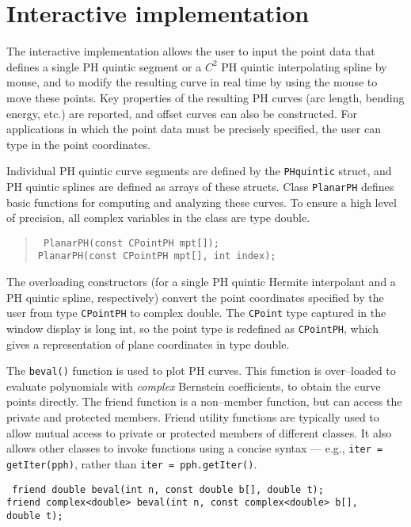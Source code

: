 \documentclass[12pt]{article}
\begin{document}
\section{Interactive implementation}

The interactive implementation allows the user to input the point data 
that defines a single PH quintic segment or a $C^2$ PH quintic interpolating 
spline by mouse, and to modify the resulting curve in real time by using 
the mouse to move these points. Key properties of the resulting PH curves 
(arc length, bending energy, etc.) are reported, and offset curves can 
also be constructed. For applications in which the point data must be 
precisely specified, the user can type in the point coordinates.

Individual PH quintic curve segments are defined by the {\tt PHquintic} 
struct, and PH quintic splines are defined as arrays of these structs. 
Class {\tt PlanarPH} defines basic functions for computing and analyzing 
these curves. To ensure a high level of precision, all complex variables 
in the class are type double.

\begin{quote}
{\tt
PlanarPH(const CPointPH m\underline{\hphantom{x}}pt[]); \\
PlanarPH(const CPointPH m\underline{\hphantom{x}}pt[], int index);
}
\end{quote}

\noindent
The overloading constructors (for a single PH quintic Hermite interpolant
and a PH quintic spline, respectively) convert the point coordinates 
specified by the user from type {\tt CPointPH} to complex double. The 
{\tt CPoint} type captured in the window display is long int, so the point 
type is redefined as {\tt CPointPH}, which gives a representation of plane 
coordinates in type double.

The {\tt beval()} function is used to plot PH curves. This function 
is over--loaded to evaluate polynomials with {\it complex\/} Bernstein 
coefficients, to obtain the curve points directly. The friend function is 
a non--member function, but can access the private and protected members. 
Friend utility functions are typically used to allow mutual access to 
private or protected members of different classes. It also allows other 
classes to invoke functions using a concise syntax --- e.g., {\tt iter 
= getIter(pph)}, rather than {\tt iter = pph.getIter()}.

\bigskip\noindent
{\tt
friend double beval(int n, const double b[], double t); \\
friend complex<double> beval(int n, const complex<double> b[], \\
\mbox{} \hfill double t);
}
\end{document}
